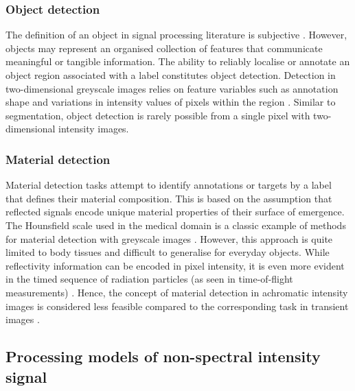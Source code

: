 \documentclass[12pt,a4paper,oneside]{report}
\begin{document}
\subsubsection{Object detection}
\label{subsubsec:object_detection_intensity}

The definition of an object in signal processing literature is subjective \cite{redmon2015,redmon2018}. However, objects may represent an organised collection of features that communicate meaningful or tangible information. The ability to reliably localise or annotate an object region associated with a label constitutes object detection. Detection in two-dimensional greyscale images relies on feature variables such as annotation shape and variations in intensity values of pixels within the region \cite{redmon2015,redmon2018,liu2016}. Similar to segmentation, object detection is rarely possible from a single pixel with two-dimensional intensity images.

\subsubsection{Material detection}
\label{subsubsec:material_detection_intensity}

Material detection tasks attempt to identify annotations or targets by a label that defines their material composition. This is based on the assumption that reflected signals encode unique material properties of their surface of emergence. The Hounsfield scale used in the medical domain is a classic example of methods for material detection with greyscale images \cite{huang1991}. However, this approach is quite limited to body tissues and difficult to generalise for everyday objects. While reflectivity information can be encoded in pixel intensity, it is even more evident in the timed sequence of radiation particles (as seen in time-of-flight measurements) \cite{su2016,becker2023}. Hence, the concept of material detection in achromatic intensity images is considered less feasible compared to the corresponding task in transient images \cite{su2016,becker2023,tafone2023}.


\subsection{Processing models of non-spectral intensity signal}
\label{subsec:processing_models_spectral_intensity}
\end{document}
